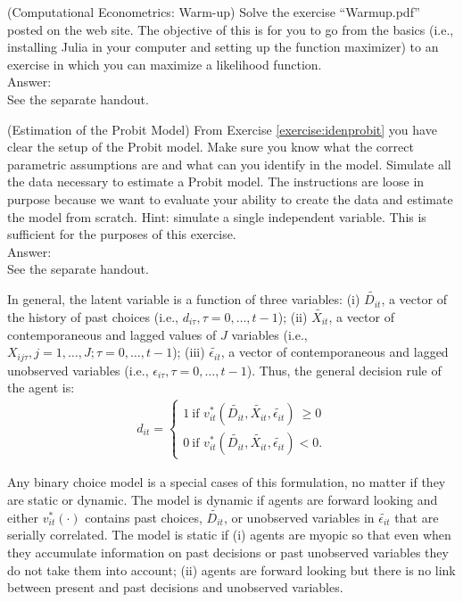 \begin{exercise} (Computational Econometrics: Warm-up)
Solve the exercise ``Warmup.pdf'' posted on the web site. The objective of this is for you to go from the basics (i.e., installing Julia in your computer and setting up the function maximizer) to an exercise in which you can maximize a likelihood function.\\
\noindent Answer:\\
\noindent See the separate handout. 
\end{exercise}

\begin{exercise} (Estimation of the Probit Model)
From Exercise \ref{exercise:idenprobit} you have clear the setup of the Probit model. Make sure you know what the correct parametric assumptions are and what can you identify in the model. Simulate all the data necessary to estimate a Probit model. The instructions are loose in purpose because we want to evaluate your ability to create the data and estimate the model from scratch. Hint: simulate a single independent variable. This is sufficient for the purposes of this exercise.\\
\noindent Answer:\\
\noindent See the separate handout. 
\end{exercise}

\indent In general, the latent variable is a function of three variables: (i) $\tilde{D_{it}}$, a vector of the history of past choices (i.e., $d_{i\tau}, \tau = 0, \ldots, t-1$); (ii) $\tilde{X_{it}}$, a vector of contemporaneous and lagged values of $J$ variables (i.e., $X_{ij\tau},  j = 1, \ldots, J; \tau = 0, \ldots, t-1$); (iii) $\tilde{\epsilon_{it}}$, a vector of contemporaneous and lagged  unobserved variables (i.e., $\epsilon_{i\tau}, \tau = 0, \ldots, t-1$). Thus, the general decision rule of the agent is:
\begin{eqnarray}
d_{it} =
\begin{cases}
1 \  \text{if }  v_{it}^* \left( \tilde{D_{it}}, \tilde{X_{it}}, \tilde{\epsilon_{it}} \right) \ \geq 0  \\
0 \  \text{if }  v_{it}^* \left( \tilde{D_{it}}, \tilde{X_{it}}, \tilde{\epsilon_{it}} \right)  < 0. \label{eq:latent}
\end{cases}
\end{eqnarray}

\indent Any binary choice model is a special cases of this formulation, no matter if they are static or dynamic. The model is dynamic if agents are forward looking and either $v_{it}^* (\cdot)$ contains past choices, $\tilde{D_{it}}$, or unobserved variables in $\tilde{\epsilon_{it}}$ that are serially correlated. The model is static if (i) agents are myopic so that even when they accumulate information on past decisions or past unobserved variables they do not take them into account; (ii) agents are forward looking but there is no link between present and past decisions and unobserved variables.

